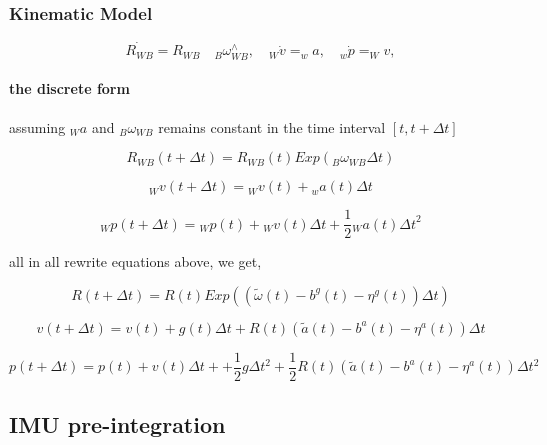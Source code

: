 \documentclass[10pt,a4paper]{article}
\begin{document}
\subsubsection{Kinematic Model}
\begin{equation}
\dot{R_{WB}} = R_{WB}\quad {_B}\omega_{WB}^{\wedge}, \quad _W\dot{v} = _wa, \quad _w\dot{p}=_Wv,
\end{equation}

\paragraph{the discrete form}
assuming ${_W}a$ and $_B\omega_{WB}$ remains constant in the time interval ${[t, {t+\Delta t}]}$

\begin{equation}
R_{WB}(t+\Delta t) = R_{WB}(t) Exp(_B \omega_{WB} \Delta t)
\end{equation}

\begin{equation}
{_W}v(t+\Delta t) = {_W}v(t) + {_w}a(t)\Delta t
\end{equation}

\begin{equation}
{_W}p(t+\Delta t) = {_W}p(t) + {_W}v(t)\Delta t + \frac{1}{2} {_W}a(t) {\Delta t}^2
\end{equation}

all in all rewrite equations above, we get,

\begin{equation}
R(t+\Delta t) = R(t) Exp(( \tilde{\omega}(t) - b^g(t) - \eta^g(t)) \Delta t)
\end{equation}

\begin{equation}
v(t+\Delta t) =v(t) + g(t) \Delta t + R(t)(\tilde{a}(t) -b^a(t) - \eta^a(t)) \Delta t
\end{equation}

\begin{equation}
p(t+\Delta t) = p(t) + v(t)\Delta t + + \frac{1}{2}g\Delta t^2
 + \frac{1}{2} R(t)(\tilde{a}(t) -b^a(t) - \eta^a(t)) \Delta t^2
\end{equation}

\subsection{IMU pre-integration}
\end{document}
